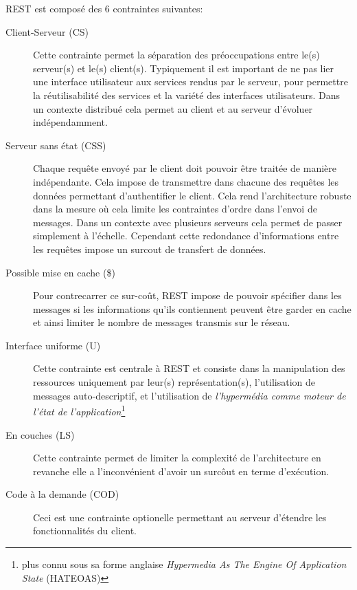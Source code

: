 \documentclass[a4paper, 11pt]{report}
\begin{document}
REST est composé des 6 contraintes suivantes:

\begin{description}
\item[Client-Serveur (CS)] Cette contrainte permet la séparation des
  préoccupations entre le(s) serveur(s) et le(s) client(s).
  Typiquement il est important de ne pas lier une interface
  utilisateur aux services rendus par le serveur, pour permettre la
  réutilisabilité des services et la variété des interfaces
  utilisateurs.  Dans un contexte distribué cela permet au client et
  au serveur d'évoluer indépendamment.

\item[Serveur sans état (CSS)] Chaque requête envoyé par le client
  doit pouvoir être traitée de manière indépendante.  Cela impose de
  transmettre dans chacune des requêtes les données permettant
  d'authentifier le client.  Cela rend l'architecture robuste dans la
  mesure où cela limite les contraintes d'ordre dans l'envoi de
  messages.  Dans un contexte avec plusieurs serveurs cela permet de
  passer simplement à l'échelle.  Cependant cette redondance
  d'informations entre les requêtes impose un surcout de transfert de
  données.

\item [Possible mise en cache (\$)] Pour contrecarrer ce sur-coût,
  REST impose de pouvoir spécifier dans les messages si les
  informations qu'ils contiennent peuvent être garder en cache et
  ainsi limiter le nombre de messages transmis sur le réseau.

\item[Interface uniforme (U)] Cette contrainte est centrale à REST et
  consiste dans la manipulation des ressources uniquement par leur(s)
  représentation(s), l'utilisation de messages auto-descriptif, et
  l'utilisation de \emph{l'hypermédia comme moteur de l'état de
    l'application}\footnote{plus connu sous sa forme anglaise
    \emph{Hypermedia As The Engine Of Application State} (HATEOAS)}

\item[En couches (LS)] Cette contrainte permet de limiter la
  complexité de l'architecture en revanche elle a l'inconvénient
  d'avoir un surcôut en terme d'exécution.

\item[Code à la demande (COD)] Ceci est une contrainte optionelle
  permettant au serveur d'étendre les fonctionnalités du client.
\end{description}
\end{document}
